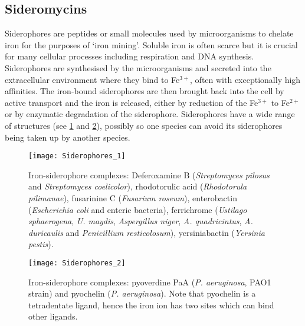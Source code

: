 



\subsection{Sideromycins}


Siderophores are peptides or small molecules used by microorganisms to chelate iron for the purposes of `iron mining'\cite{Hider2010}. Soluble iron is often scarce but it is crucial for many cellular processes including respiration and DNA synthesis. Siderophores are synthesised by the microorganisms and secreted into the extracellular environment where they bind to Fe$^{3+}$, often with exceptionally high affinities. The iron-bound siderophores are then brought back into the cell by active transport and the iron is released, either by reduction of the Fe$^{3+}$ to Fe$^{2+}$ or by enzymatic degradation of the siderophore. Siderophores have a wide range of structures (see \ref{fgr:Sids} and \ref{fgr:Sids_2}), possibly so one species can avoid its siderophores being taken up by another species\cite{Seyedsayamdost2012}.

\begin{figure}[H]
	\begin{center}
		\texttt{[image: Siderophores\_1]}
		\caption{Iron-siderophore complexes:
		Deferoxamine B \cite{Zheng2012} (\textit{Streptomyces pilosus} and \textit{Streptomyces coelicolor}), 
		rhodotorulic acid \cite{Carrano1978} (\textit{Rhodotorula pilimanae}),
		fusarinine C \cite{Hossain1980} (\textit{Fusarium roseum}),
		enterobactin \cite{Zheng2012} (\textit{Escherichia coli} and enteric bacteria),
		ferrichrome \cite{vanderHelm1980} (\textit{Ustilago sphaerogena}, \textit{U. maydis}, \textit{Aspergillus niger}, \textit{A. quadricintus}, \textit{A. duricaulis} and \textit{Penicillium resticolosum}),
		yersiniabactin \cite{Zheng2012} (\textit{Yersinia pestis}).
		\label{fgr:Sids}}
	\end{center}
\end{figure}

\begin{figure}[H]
	\begin{center}
		\texttt{[image: Siderophores\_2]}
		\caption{Iron-siderophore complexes:
		pyoverdine PaA \cite{Zheng2012,Meyer2000} (\textit{P. aeruginosa}, PAO1 strain) and pyochelin \cite{Schlegel2006,Cobessi2005} (\textit{P. aeruginosa}). 
		Note that pyochelin  is a tetradentate ligand, hence the iron ion has two sites which can bind other ligands. \label{fgr:Sids_2}}
	\end{center}
\end{figure}

